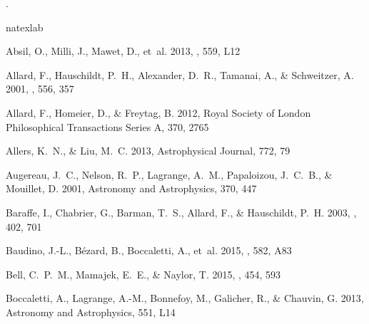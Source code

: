 \documentclass[twocolumn]{aastex6}
\begin{document}
.


\begin{thebibliography}{}
\expandafter\ifx\csname natexlab\endcsname\relax\def\natexlab#1{#1}\fi

{Absil}, O., {Milli}, J., {Mawet}, D., {et~al.} 2013, \aap, 559, L12

{Allard}, F., {Hauschildt}, P.~H., {Alexander}, D.~R., {Tamanai}, A., \&
  {Schweitzer}, A. 2001, \apj, 556, 357

{Allard}, F., {Homeier}, D., \& {Freytag}, B. 2012, Royal Society of London
  Philosophical Transactions Series A, 370, 2765

{Allers}, K.~N., \& {Liu}, M.~C. 2013, Astrophysical Journal, 772, 79

{Augereau}, J.~C., {Nelson}, R.~P., {Lagrange}, A.~M., {Papaloizou}, J.~C.~B.,
  \& {Mouillet}, D. 2001, Astronomy and Astrophysics, 370, 447

{Baraffe}, I., {Chabrier}, G., {Barman}, T.~S., {Allard}, F., \& {Hauschildt},
  P.~H. 2003, \aap, 402, 701

{Baudino}, J.-L., {B{\'e}zard}, B., {Boccaletti}, A., {et~al.} 2015, \aap, 582,
  A83

{Bell}, C.~P.~M., {Mamajek}, E.~E., \& {Naylor}, T. 2015, \mnras, 454, 593

{Boccaletti}, A., {Lagrange}, A.-M., {Bonnefoy}, M., {Galicher}, R., \&
  {Chauvin}, G. 2013, Astronomy and Astrophysics, 551, L14


\end{thebibliography}
\end{document}
